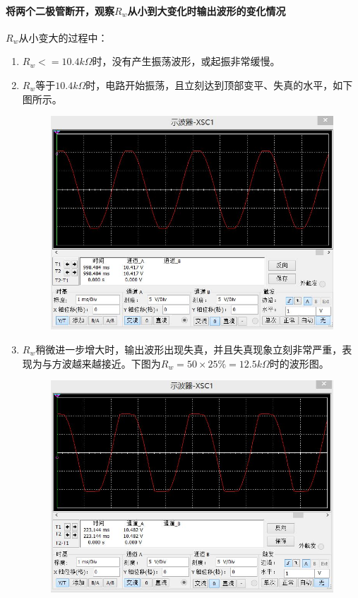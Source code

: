 \documentclass[12pt,a4paper]{article}
\begin{document}
\begin{spacing}{1.3}
\paragraph{将两个二极管断开，观察$R_w$从小到大变化时输出波形的变化情况} $R_w$从小变大的过程中：
\begin{enumerate}
\item $R_w<=10.4k\Omega$时，没有产生振荡波形，或起振非常缓慢。
\item $R_w等于10.4k\Omega$时，电路开始振荡，且立刻达到顶部变平、失真的水平，如下图所示。
\begin{figure}[H]
\centering
\includegraphics[width=\textwidth]{6-1.jpg}
\end{figure}
\item $R_w$稍微进一步增大时，输出波形出现失真，并且失真现象立刻非常严重，表现为与方波越来越接近。下图为$R_w=50\times 25\% = 12.5k\Omega$时的波形图。
\begin{figure}[H]
\centering
\includegraphics[width=\textwidth]{6-2.jpg}
\end{figure}
\end{enumerate}

\end{spacing}
\end{document}
